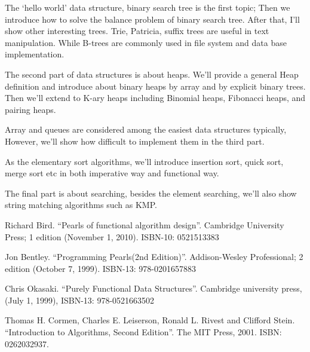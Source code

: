\documentclass{article}
\begin{document}
The `hello world' data structure, binary search tree is the
first topic; Then we introduce how to solve the balance problem
of binary search tree. After that, I'll show other interesting
trees. Trie, Patricia, suffix trees are useful in text manipulation.
While B-trees are commonly used in file system and data base
implementation.

The second part of data structures is about heaps. We'll
provide a general Heap definition and introduce about binary
heaps by array and by explicit binary trees. Then we'll
extend to K-ary heaps including Binomial heaps, Fibonacci
heaps, and pairing heaps.

Array and queues are considered among the easiest data structures
typically, However, we'll show how difficult to implement
them in the third part.

As the elementary sort algorithms, we'll introduce insertion
sort, quick sort, merge sort etc in both imperative way
and functional way.

The final part is about searching, besides the element
searching, we'll also show string matching algorithms
such as KMP.

\begin{thebibliography}{99}

Richard Bird. ``Pearls of functional algorithm design''. Cambridge University Press; 1 edition (November 1, 2010). ISBN-10: 0521513383

Jon Bentley. ``Programming Pearls(2nd Edition)''. Addison-Wesley Professional; 2 edition (October 7, 1999). ISBN-13: 978-0201657883

Chris Okasaki. ``Purely Functional Data Structures''. Cambridge university press, (July 1, 1999), ISBN-13: 978-0521663502

Thomas H. Cormen, Charles E. Leiserson, Ronald L. Rivest and Clifford Stein. ``Introduction to Algorithms, Second Edition''. The MIT Press, 2001. ISBN: 0262032937.

\end{thebibliography}

\ifx\wholebook\relax \else
\end{document}
